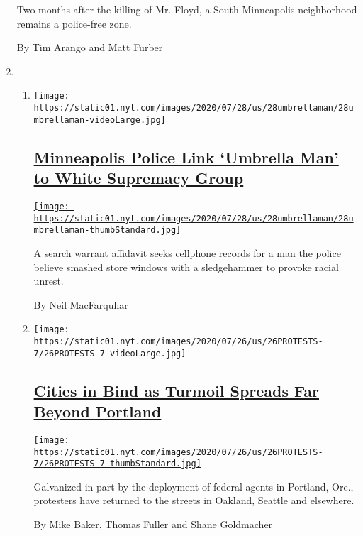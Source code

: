 \begin{enumerate}
  Two months after the killing of Mr. Floyd, a South Minneapolis
  neighborhood remains a police-free zone.

  By Tim Arango and Matt Furber
\item
  \begin{enumerate}
  \def\labelenumii{\arabic{enumii}.}
  \item
    \texttt{[image: https://static01.nyt.com/images/2020/07/28/us/28umbrellaman/28umbrellaman-videoLarge.jpg]}

    \hypertarget{minneapolis-police-link-umbrella-man-to-white-supremacy-group}{%
    \subsection{\texorpdfstring{\href{/2020/07/28/us/umbrella-man-identified-minneapolis.html}{Minneapolis
    Police Link `Umbrella Man' to White Supremacy
    Group}}{Minneapolis Police Link `Umbrella Man' to White Supremacy Group}}\label{minneapolis-police-link-umbrella-man-to-white-supremacy-group}}

    \href{/2020/07/28/us/umbrella-man-identified-minneapolis.html}{\texttt{[image: https://static01.nyt.com/images/2020/07/28/us/28umbrellaman/28umbrellaman-thumbStandard.jpg]}}

    A search warrant affidavit seeks cellphone records for a man the
    police believe smashed store windows with a sledgehammer to provoke
    racial unrest.

    By Neil MacFarquhar
  \item
    \texttt{[image: https://static01.nyt.com/images/2020/07/26/us/26PROTESTS-7/26PROTESTS-7-videoLarge.jpg]}

    \hypertarget{cities-in-bind-as-turmoil-spreads-far-beyond-portland}{%
    \subsection{\texorpdfstring{\href{/2020/07/26/us/protests-portland-seattle-trump.html}{Cities
    in Bind as Turmoil Spreads Far Beyond
    Portland}}{Cities in Bind as Turmoil Spreads Far Beyond Portland}}\label{cities-in-bind-as-turmoil-spreads-far-beyond-portland}}

    \href{/2020/07/26/us/protests-portland-seattle-trump.html}{\texttt{[image: https://static01.nyt.com/images/2020/07/26/us/26PROTESTS-7/26PROTESTS-7-thumbStandard.jpg]}}

    Galvanized in part by the deployment of federal agents in Portland,
    Ore., protesters have returned to the streets in Oakland, Seattle
    and elsewhere.

    By Mike Baker, Thomas Fuller and Shane Goldmacher
  \end{enumerate}
\end{enumerate}

